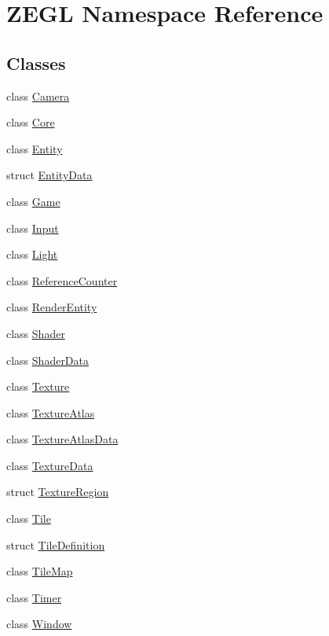 \hypertarget{namespace_z_e_g_l}{}\section{Z\+E\+G\+L Namespace Reference}
\label{namespace_z_e_g_l}
\subsection*{Classes}
\begin{DoxyCompactItemize}
\item 
class \hyperlink{class_z_e_g_l_1_1_camera}{Camera}
\item 
class \hyperlink{class_z_e_g_l_1_1_core}{Core}
\item 
class \hyperlink{class_z_e_g_l_1_1_entity}{Entity}
\item 
struct \hyperlink{struct_z_e_g_l_1_1_entity_data}{Entity\+Data}
\item 
class \hyperlink{class_z_e_g_l_1_1_game}{Game}
\item 
class \hyperlink{class_z_e_g_l_1_1_input}{Input}
\item 
class \hyperlink{class_z_e_g_l_1_1_light}{Light}
\item 
class \hyperlink{class_z_e_g_l_1_1_reference_counter}{Reference\+Counter}
\item 
class \hyperlink{class_z_e_g_l_1_1_render_entity}{Render\+Entity}
\item 
class \hyperlink{class_z_e_g_l_1_1_shader}{Shader}
\item 
class \hyperlink{class_z_e_g_l_1_1_shader_data}{Shader\+Data}
\item 
class \hyperlink{class_z_e_g_l_1_1_texture}{Texture}
\item 
class \hyperlink{class_z_e_g_l_1_1_texture_atlas}{Texture\+Atlas}
\item 
class \hyperlink{class_z_e_g_l_1_1_texture_atlas_data}{Texture\+Atlas\+Data}
\item 
class \hyperlink{class_z_e_g_l_1_1_texture_data}{Texture\+Data}
\item 
struct \hyperlink{struct_z_e_g_l_1_1_texture_region}{Texture\+Region}
\item 
class \hyperlink{class_z_e_g_l_1_1_tile}{Tile}
\item 
struct \hyperlink{struct_z_e_g_l_1_1_tile_definition}{Tile\+Definition}
\item 
class \hyperlink{class_z_e_g_l_1_1_tile_map}{Tile\+Map}
\item 
class \hyperlink{class_z_e_g_l_1_1_timer}{Timer}
\item 
class \hyperlink{class_z_e_g_l_1_1_window}{Window}
\end{DoxyCompactItemize}
